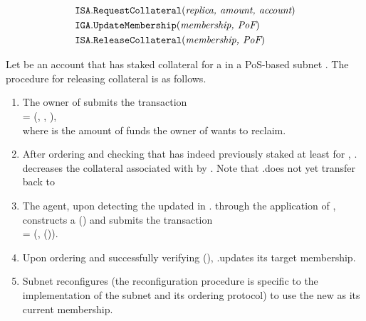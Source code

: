 \begin{align*}
    \texttt{ISA}.&\texttt{RequestCollateral}(\textit{replica, amount, account})\\
    \texttt{IGA}.&\texttt{UpdateMembership}(\textit{membership, \textit{PoF}})\\
    \texttt{ISA}.&\texttt{ReleaseCollateral}(\textit{membership, \textit{PoF}})
\end{align*}

Let  be an account that has staked collateral for a  in a PoS-based subnet .
The procedure for releasing collateral is as follows.

\begin{enumerate}

    \item The owner of  submits the transaction\\
     = (, , ),\\
    where  is the amount of funds the owner of  wants to reclaim.

    \item After ordering  and checking that  has indeed previously staked at least  for ,
    . decreases the collateral associated with  by .
    Note that .\sa does not yet transfer  back to 

    \item The \ipc agent, upon detecting the updated  in . through the application of ,
    constructs a {\pof}() and submits the transaction\\
     = (, {\pof}()).

    \item Upon ordering  and successfully verifying {\pof}(), .\gw updates its target membership.

    \item Subnet  reconfigures (the reconfiguration procedure is specific to the implementation of the subnet and its ordering protocol)
    to use the new  as its current membership.


\end{enumerate}
